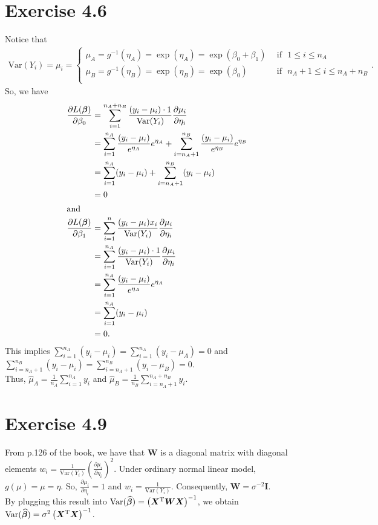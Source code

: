 \documentclass[a4paper]{article}
\newcommand{\Var}{\mathrm{Var}}
\begin{document}
\section{Exercise 4.6}
Notice that
\begin{align*}
\Var(Y_{i}) = \mu_{i} =
\begin{cases}
\mu_{A} = g^{-1}(\eta_{A}) = \exp(\eta_{A}) = \exp(\beta_{0} + \beta_{1}) ~~&\mbox{if}~~~ 1 \leq i \leq n_{A}\\
\mu_{B} = g^{-1}(\eta_{B}) = \exp(\eta_{B}) = \exp(\beta_{0}) ~~&\mbox{if}~~~ n_{A}+1 \leq i \leq n_{A}+n_{B}\\
\end{cases}.
\end{align*}
So, we have
\begin{align*}
\frac{\partial L(\bm{\beta})}{\partial \beta_{0}} &= \sum_{i=1}^{n_{A}+n_{B}}\frac{(y_{i}-\mu_{i})\cdot 1}{\Var(Y_{i})}\frac{\partial \mu_{i}}{\partial \eta_{i}}\\
&= \sum_{i=1}^{n_{A}}\frac{(y_{i}-\mu_{i})}{e^{\eta_{A}}}e^{\eta_{A}} + \sum_{i=n_{A}+1}^{n_{B}}\frac{(y_{i}-\mu_{i})}{e^{\eta_{B}}}e^{\eta_{B}}\\
&= \sum_{i=1}^{n_{A}}(y_{i}-\mu_{i}) + \sum_{i=n_{A}+1}^{n_{B}}(y_{i}-\mu_{i})\\
&= 0\\ \intertext{and}
\frac{\partial L(\bm{\beta})}{\partial \beta_{1}} &= \sum_{i=1}^{n}\frac{(y_{i}-\mu_{i})x_{i}}{\Var(Y_{i})}\frac{\partial \mu_{i}}{\partial \eta_{i}}\\
&= \sum_{i=1}^{n_{A}}\frac{(y_{i}-\mu_{i})\cdot 1}{\Var(Y_{i})}\frac{\partial \mu_{i}}{\partial \eta_{i}}\\
&= \sum_{i=1}^{n_{A}}\frac{(y_{i}-\mu_{i})}{e^{\eta_{A}}}e^{\eta_{A}}\\
&= \sum_{i=1}^{n_{A}}(y_{i}-\mu_{i})\\
&= 0.
\end{align*}
This implies $\sum_{i=1}^{n_{A}}(y_{i}-\mu_{i}) = \sum_{i=1}^{n_{A}}(y_{i}-\mu_{A}) = 0$ and $\sum_{i=n_{A}+1}^{n_{B}}(y_{i}-\mu_{i}) = \sum_{i=n_{A}+1}^{n_{B}}(y_{i}-\mu_{B}) = 0$.\\
Thus, $\widehat{\mu}_{A} = \frac{1}{n_{A}}\sum_{i=1}^{n_{A}} y_{i}$ and $\widehat{\mu}_{B} = \frac{1}{n_{B}}\sum_{i=n_{A}+1}^{n_{A}+n_{B}} y_{i}$.



\vspace{\baselineskip}
\section{Exercise 4.9}
From p.126 of the book, we have that $\bm{W}$ is a diagonal matrix with diagonal elements $w_{i} = \frac{1}{\Var(Y_{i})}\left(\frac{\partial \mu_{i}}{\partial \eta_{i}}\right)^{2}$. Under ordinary normal linear model, $g(\mu) = \mu = \eta$. So, $\frac{\partial \mu_{i}}{\partial \eta_{i}} = 1$ and $w_{i} = \frac{1}{\Var(Y_{i})}$. Consequently, $\bm{W} = \sigma^{-2}\bm{I}$.\\
By plugging this result into $\Var(\widehat{\bm{\beta}}) = \left(\bm{X}^{\rm T}\bm{W}\bm{X}\right)^{-1}$, we obtain $\Var(\widehat{\bm{\beta}}) = \sigma^{2}\left(\bm{X}^{\rm T}\bm{X}\right)^{-1}$.
\end{document}
